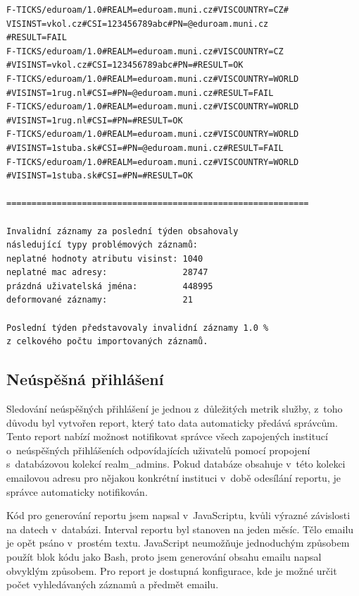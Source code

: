 \documentclass[thesis=M,czech]{FITthesis}[2012/06/26]
\begin{document}
      \begin{verbatim}
F-TICKS/eduroam/1.0#REALM=eduroam.muni.cz#VISCOUNTRY=CZ#
VISINST=vkol.cz#CSI=123456789abc#PN=@eduroam.muni.cz
#RESULT=FAIL
F-TICKS/eduroam/1.0#REALM=eduroam.muni.cz#VISCOUNTRY=CZ
#VISINST=vkol.cz#CSI=123456789abc#PN=#RESULT=OK
F-TICKS/eduroam/1.0#REALM=eduroam.muni.cz#VISCOUNTRY=WORLD
#VISINST=1rug.nl#CSI=#PN=@eduroam.muni.cz#RESULT=FAIL
F-TICKS/eduroam/1.0#REALM=eduroam.muni.cz#VISCOUNTRY=WORLD
#VISINST=1rug.nl#CSI=#PN=#RESULT=OK
F-TICKS/eduroam/1.0#REALM=eduroam.muni.cz#VISCOUNTRY=WORLD
#VISINST=1stuba.sk#CSI=#PN=@eduroam.muni.cz#RESULT=FAIL
F-TICKS/eduroam/1.0#REALM=eduroam.muni.cz#VISCOUNTRY=WORLD
#VISINST=1stuba.sk#CSI=#PN=#RESULT=OK

============================================================

Invalidní záznamy za poslední týden obsahovaly 
následující typy problémových záznamů:
neplatné hodnoty atributu visinst: 1040
neplatné mac adresy:               28747
prázdná uživatelská jména:         448995
deformované záznamy:               21

Poslední týden představovaly invalidní záznamy 1.0 % 
z celkového počtu importovaných záznamů.
      \end{verbatim}

    \subsection{Neúspěšná přihlášení}
      
      Sledování neúspěšných přihlášení je jednou z~důležitých metrik služby,
      z~toho důvodu byl vytvořen report, který tato data automaticky předává správcům.
      Tento report nabízí možnost notifikovat správce všech zapojených institucí
      o~neúspěšných přihlášeních odpovídajících uživatelů pomocí propojení
      s~databázovou kolekcí realm\_admins.
      Pokud databáze obsahuje v~této kolekci emailovou adresu pro nějakou konkrétní
      instituci v~době odesílání reportu, je správce automaticky notifikován.

      Kód pro generování reportu jsem napsal v~JavaScriptu, kvůli výrazné závislosti na datech v~databázi.
      Interval reportu byl stanoven na jeden měsíc.
      Tělo emailu je opět psáno v~prostém textu.
      JavaScript neumožňuje jednoduchým způsobem použít blok kódu jako Bash,
      proto jsem generování obsahu emailu napsal obvyklým způsobem.
      Pro report je dostupná konfigurace, kde je možné určit počet vyhledávaných záznamů a předmět emailu.
\end{document}
